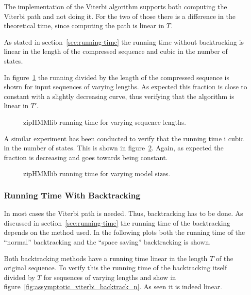 The implementation of the Viterbi algorithm supports both computing the Viterbi
path and not doing it. For the two of those there is a difference in the
theoretical time, since computing the path is linear in $T$.

As stated in section~\ref{sec:running-time} the running time without
backtracking is linear in the length of the compressed sequence and cubic in
the number of states.

In figure~\ref{fig:assymptotic_viterbi_n} the running divided by the length of
the compressed sequence is shown for input sequences of varying lengths. As
expected this fraction is close to constant with a slightly decreasing curve,
thus verifying that the algorithm is linear in $T'$.

\begin{figure}
  \centering
  
  \caption{zipHMMlib running time for varying sequence lengths.}
  \label{fig:assymptotic_viterbi_n}
\end{figure}

A similar experiment has been conducted to verify that the running time i cubic
in the number of states. This is shown in
figure~\ref{fig:assymptotic_viterbi_k}. Again, as expected the fraction is
decreasing and goes towards being constant.

\begin{figure}
  \centering
  
  \caption{zipHMMlib running time for varying model sizes.}
  \label{fig:assymptotic_viterbi_k}
\end{figure}

\subsubsection{Running Time With Backtracking}

In most cases the Viterbi path is needed. Thus, backtracking has to be
done. As discussed in section~\ref{sec:running-time} the running time of the
backtracking depends on the method used. In the following plots both the
running time of the ``normal'' backtracking and the ``space saving''
backtracking is shown.

Both backtracking methods have a running time linear in the length $T$ of the
original sequence. To verify this the running time of the backtracking itself
divided by $T$ for sequences of varying lengths and show in
figure~\ref{fig:assymptotic_viterbi_backtrack_n}. As seen it is indeed
linear.

